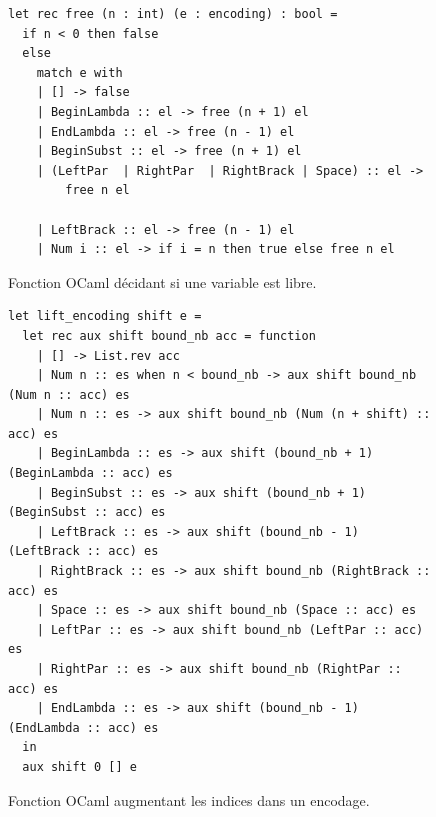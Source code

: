 \documentclass[a4paper, 11pt]{article}
\theoremstyle{definition}
\begin{document}
\begin{figure}[h]
  \begin{center}    
\begin{lstlisting}
let rec free (n : int) (e : encoding) : bool =
  if n < 0 then false
  else
    match e with
    | [] -> false
    | BeginLambda :: el -> free (n + 1) el
    | EndLambda :: el -> free (n - 1) el
    | BeginSubst :: el -> free (n + 1) el
    | (LeftPar  | RightPar  | RightBrack | Space) :: el ->
        free n el

    | LeftBrack :: el -> free (n - 1) el
    | Num i :: el -> if i = n then true else free n el
\end{lstlisting}
  \end{center}
  \caption{Fonction OCaml décidant si une variable est libre.}\label{fig:isFree}
\end{figure}

\begin{figure}[h]
  \begin{center}
\begin{lstlisting}
let lift_encoding shift e =
  let rec aux shift bound_nb acc = function
    | [] -> List.rev acc
    | Num n :: es when n < bound_nb -> aux shift bound_nb (Num n :: acc) es
    | Num n :: es -> aux shift bound_nb (Num (n + shift) :: acc) es
    | BeginLambda :: es -> aux shift (bound_nb + 1) (BeginLambda :: acc) es
    | BeginSubst :: es -> aux shift (bound_nb + 1) (BeginSubst :: acc) es
    | LeftBrack :: es -> aux shift (bound_nb - 1) (LeftBrack :: acc) es
    | RightBrack :: es -> aux shift bound_nb (RightBrack :: acc) es
    | Space :: es -> aux shift bound_nb (Space :: acc) es
    | LeftPar :: es -> aux shift bound_nb (LeftPar :: acc) es
    | RightPar :: es -> aux shift bound_nb (RightPar :: acc) es
    | EndLambda :: es -> aux shift (bound_nb - 1) (EndLambda :: acc) es
  in
  aux shift 0 [] e
\end{lstlisting}
  \end{center}
  \caption{Fonction OCaml augmentant les indices dans un encodage.}\label{fig:lift}
\end{figure}
\end{document}
